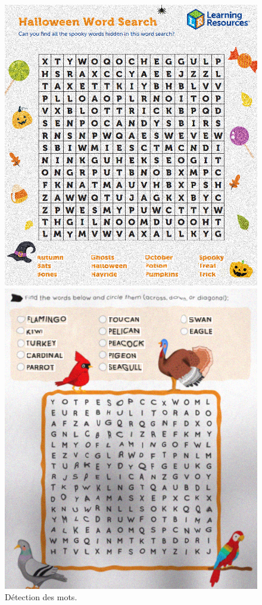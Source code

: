 \documentclass{article}
\begin{document}
\begin{figure}[H]
  \centering
      \includegraphics[width=\linewidth]{ressources/image_2_word_detection_10_detected_words.png}
      \caption{}
    \endminipage\quad\quad\quad\quad
    \includegraphics[width=\linewidth]{ressources/image_3_word_detection_10_detected_words.png}
    \caption{}
  \endminipage
  \caption{Détection des mots.}
\end{figure}
\newpage
\end{document}
